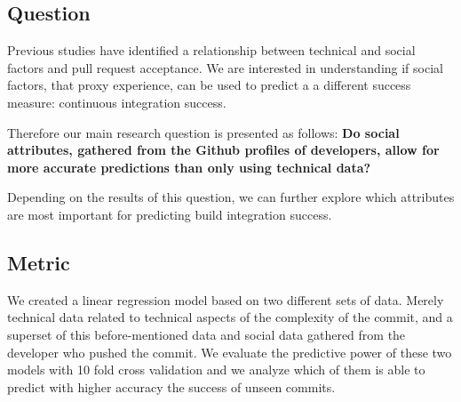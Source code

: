 \documentclass[10pt, conference]{IEEEtran}
\begin{document}
\subsection{Question}

Previous studies have identified a relationship between technical and social 
factors and pull request acceptance. We are interested in understanding if
social factors, that proxy experience, can be used to predict a
a different success measure: continuous integration success.

Therefore our main research question is presented as follows:
\newline \newline
\textbf{Do social attributes, gathered 
from the Github profiles of developers,
allow for more accurate predictions than only using technical data?}
\newline \newline

Depending on the results of this question, we can further explore which
attributes are most important for predicting build integration success.

\begin{comment}
we have created a dataset with technical attributes to be able to analyze the predictiveness of these attributes and its relationship with commit integration success. This way, we are able to create a model
We are afterwards interested in knowing if adding social attributes to this 
predictability model will increase the probability of the model asserting 
correctly future instances by knowing not only technical data about the commit 
being pushed but also social attributes of the developer pushing the changes.
\end{comment}


\subsection{Metric}
We created a linear regression model based on two different sets of data. Merely 
technical data related to technical aspects of the complexity of the commit, and 
a superset of this before-mentioned data and social data gathered from the 
developer who pushed the commit. We evaluate the predictive power of these two 
models with 10 fold cross validation and we analyze which of them is able to 
predict with higher accuracy the success of unseen commits.
\end{document}
